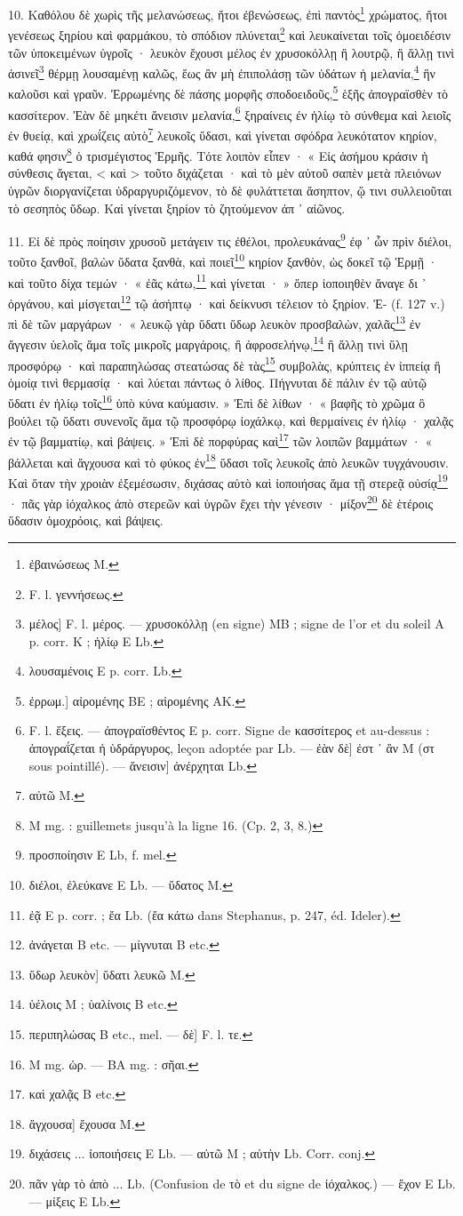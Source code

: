 \documentclass[a4paper, 11pt, oneside, polutonikogreek, french]{article}
\begin{document}
10. Καθόλου δὲ χωρὶς τῆς μελανώσεως, ἤτοι ἐβενώσεως, ἐπὶ παντὸς\footnote{ἐβαινώσεως M.} χρώματος, ἤτοι γενέσεως ξηρίου καὶ φαρμάκου, τὸ σπόδιον πλύνεται\footnote{F. l. γεννήσεως.} καὶ λευκαίνεται τοῖς ὁμοειδέσιν τῶν ὑποκειμένων ὑγροῖς · λευκὸν ἔχουσι μέλος ἐν χρυσοκόλλῃ ἢ λουτρῷ, ἢ ἄλλῃ τινὶ ἀσινεῖ\footnote{μέλος] F. l. μέρος. --- χρυσοκόλλῃ (en signe) MB ; signe de l'or et du soleil A p. corr. K ; ἡλίῳ E Lb.} θέρμῃ λουσαμένῃ καλῶς, ἕως ἂν μὴ ἐπιπολάσῃ τῶν ὑδάτων ἡ μελανία,\footnote{λουσαμένοις E p. corr. Lb.} ἣν καλοῦσι καὶ γραῦν. Ἐρρωμένης δὲ πάσης μορφῆς σποδοειδοῦς,\footnote{ἐρρωμ.] αἰρομένης BE ; αἱρομένης AK.} ἑξῆς ἀπογραϊσθὲν τὸ κασσίτερον. Ἐὰν δὲ μηκέτι ἄνεισιν μελανία,\footnote{F. l. ἕξεις. --- ἀπογραϊσθέντος E p. corr. Signe de κασσίτερος et au-dessus : ἀπογραΐζεται ἡ ὑδράργυρος, leçon adoptée par Lb. --- ἐὰν δὲ] ἐστ ᾽ ἂν M (στ sous pointillé). --- ἄνεισιν] ἀνέρχηται Lb.} ξηραίνεις ἐν ἡλίῳ τὸ σύνθεμα καὶ λειοῖς ἐν θυείᾳ, καὶ χρωΐζεις αὐτὸ\footnote{αὐτῶ M.} λευκοῖς ὕδασι, καὶ γίνεται σφόδρα λευκότατον κηρίον, καθά φησιν\footnote{M mg. : guillemets jusqu'à la ligne 16. (Cp. 2, 3, 8.)} ὁ τρισμέγιστος Ἑρμῆς. Τότε λοιπὸν εἶπεν · « Εἰς ἀσήμου κράσιν ἡ σύνθεσις ἄγεται, < καὶ > τοῦτο διχάζεται · καὶ τὸ μὲν αὐτοῦ σαπὲν μετὰ πλειόνων ὑγρῶν διοργανίζεται ὑδραργυριζόμενον, τὸ δὲ φυλάττεται ἄσηπτον, ᾥ τινι συλλειοῦται τὸ σεσηπὸς ὕδωρ. Καὶ γίνεται ξηρίον τὸ ζητούμενον ἀπ ᾽ αἰῶνος.

11. Εἰ δὲ πρὸς ποίησιν χρυσοῦ μετάγειν τις ἐθέλοι, προλευκάνας\footnote{προσποίησιν E Lb, f. mel.} ἐφ ᾽ ὧν πρὶν διέλοι, τοῦτο ξανθοῖ, βαλὼν ὕδατα ξανθὰ, καὶ ποιεῖ\footnote{διέλοι, ἐλεύκανε E Lb. --- ὕδατος M.} κηρίον ξανθὸν, ὡς δοκεῖ τῷ Ἑρμῇ · καὶ τοῦτο δίχα τεμών · « ἐᾶς κάτω,\footnote{ἐᾷ E p. corr. ; ἔα Lb. (ἔα κάτω dans Stephanus, p. 247, éd. Ideler).} καὶ γίνεται · » ὅπερ ἰοποιηθὲν ἄναγε δι ᾽ ὀργάνου, καὶ μίσγεται\footnote{ἀνάγεται B etc. --- μίγνυται B etc.} τῷ ἀσήπτῳ · καὶ δείκνυσι τέλειον τὸ ξηρίον. Ἐ- (f. 127 v.) πὶ δὲ τῶν μαργάρων · « λευκῷ γὰρ ὕδατι ὕδωρ λευκὸν προσβαλὼν, χαλᾶς\footnote{ὕδωρ λευκὸν] ὕδατι λευκῶ M.} ἐν ἄγγεσιν ὑελοῖς ἅμα τοῖς μικροῖς μαργάροις, ἢ ἀφροσελήνῳ,\footnote{ὑέλοις M ; ὑαλίνοις B etc.} ἢ ἄλλῃ τινὶ ὕλῃ προσφόρῳ · καὶ παραπηλώσας στεατώσας δὲ τὰς\footnote{περιπηλώσας B etc., mel. --- δὲ] F. l. τε.} συμβολὰς, κρύπτεις ἐν ἰππείᾳ ἢ ὁμοίᾳ τινὶ θερμασίᾳ · καὶ λύεται πάντως ὁ λίθος. Πήγνυται δὲ πάλιν ἐν τῷ αὐτῷ ὕδατι ἐν ἡλίῳ τοῖς\footnote{M mg. ὡρ. --- BA mg. : σῆαι.} ὑπὸ κύνα καύμασιν. » Ἐπὶ δὲ λίθων · « βαφῆς τὸ χρῶμα ὃ βούλει τῷ ὕδατι συνενοῖς ἅμα τῷ προσφόρῳ ἰοχάλκῳ, καὶ θερμαίνεις ἐν ἡλίῳ · χαλᾷς ἐν τῷ βαμματίῳ, καὶ βάψεις. » Ἐπὶ δὲ πορφύρας καὶ\footnote{καὶ χαλᾷς B etc.} τῶν λοιπῶν βαμμάτων · « βάλλεται καὶ ἄγχουσα καὶ τὸ φύκος ἐν\footnote{ἄγχουσα] ἔχουσα M.} ὕδασι τοῖς λευκοῖς ἀπὸ λευκῶν τυγχάνουσιν. Καὶ ὅταν τὴν χροιὰν ἐξεμέσωσιν, διχάσας αὐτὸ καὶ ἰοποιήσας ἅμα τῇ στερεᾷ οὐσίᾳ\footnote{διχάσεις ... ἰοποιήσεις E Lb. --- αὐτῶ M ; αὐτὴν Lb. Corr. conj.} · πᾶς γὰρ ἰόχαλκος ἀπὸ στερεῶν καὶ ὑγρῶν ἔχει τὴν γένεσιν · μίξον\footnote{πᾶν γὰρ τὸ ἀπὸ ... Lb. (Confusion de τὸ et du signe de ἰόχαλκος.) --- ἔχον E Lb. --- μίξεις E Lb.} δὲ ἑτέροις ὕδασιν ὁμοχρόοις, καὶ βάψεις.
\end{document}
